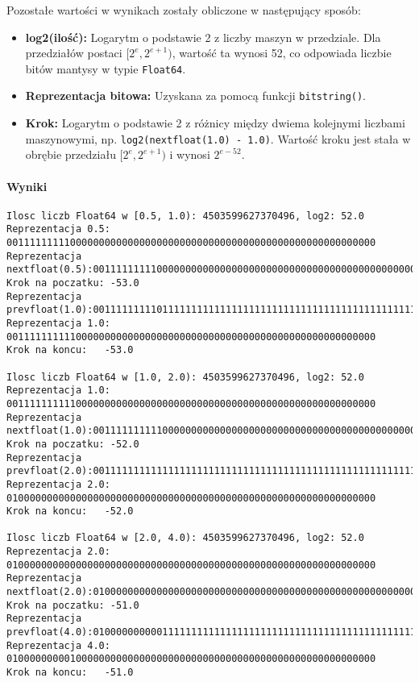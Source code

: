 \documentclass[a4paper,12pt]{article}
\begin{document}
Pozostałe wartości w wynikach zostały obliczone w następujący sposób:
\begin{itemize}
    \item \textbf{log2(ilość):} Logarytm o podstawie 2 z liczby maszyn w przedziale. Dla przedziałów postaci $[2^e, 2^{e+1})$, wartość ta wynosi 52, co odpowiada liczbie bitów mantysy w typie \texttt{Float64}.
    \item \textbf{Reprezentacja bitowa:} Uzyskana za pomocą funkcji \texttt{bitstring()}.
    \item \textbf{Krok:} Logarytm o podstawie 2 z różnicy między dwiema kolejnymi liczbami maszynowymi, np. \texttt{log2(nextfloat(1.0) - 1.0)}. Wartość kroku jest stała w obrębie przedziału $[2^e, 2^{e+1})$ i wynosi $2^{e-52}$.
\end{itemize}

\paragraph{Wyniki}
\begin{lstlisting}[breaklines=true, basicstyle=\ttfamily\small]
Ilosc liczb Float64 w [0.5, 1.0): 4503599627370496, log2: 52.0
Reprezentacja 0.5:           0011111111100000000000000000000000000000000000000000000000000000
Reprezentacja nextfloat(0.5):0011111111100000000000000000000000000000000000000000000000000001
Krok na poczatku: -53.0
Reprezentacja prevfloat(1.0):0011111111101111111111111111111111111111111111111111111111111111
Reprezentacja 1.0:           0011111111110000000000000000000000000000000000000000000000000000
Krok na koncu:   -53.0

Ilosc liczb Float64 w [1.0, 2.0): 4503599627370496, log2: 52.0
Reprezentacja 1.0:           0011111111110000000000000000000000000000000000000000000000000000
Reprezentacja nextfloat(1.0):0011111111110000000000000000000000000000000000000000000000000001
Krok na poczatku: -52.0
Reprezentacja prevfloat(2.0):0011111111111111111111111111111111111111111111111111111111111111
Reprezentacja 2.0:           0100000000000000000000000000000000000000000000000000000000000000
Krok na koncu:   -52.0

Ilosc liczb Float64 w [2.0, 4.0): 4503599627370496, log2: 52.0
Reprezentacja 2.0:           0100000000000000000000000000000000000000000000000000000000000000
Reprezentacja nextfloat(2.0):0100000000000000000000000000000000000000000000000000000000000001
Krok na poczatku: -51.0
Reprezentacja prevfloat(4.0):0100000000001111111111111111111111111111111111111111111111111111
Reprezentacja 4.0:           0100000000010000000000000000000000000000000000000000000000000000
Krok na koncu:   -51.0
\end{lstlisting}
\end{document}
